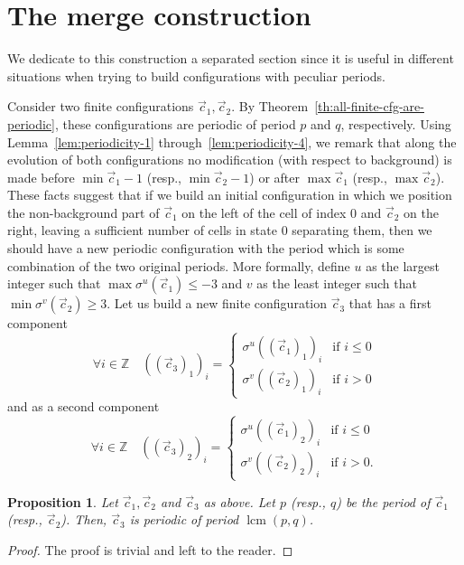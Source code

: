 \documentclass[submission,copyright,creativecommons]{eptcs}
\DeclareMathOperator{\lcm}{lcm}
\newcommand{\Z}{\ensuremath{\mathbb{Z}}\xspace}
\newtheorem{proposition}{Proposition}
\begin{document}
%
\section{The merge construction}
\label{sec:merge-construction}
%
We dedicate to this construction a separated section since it is useful in different situations
when trying to build configurations with peculiar periods.

Consider two finite configurations $\vec c_1, \vec c_2$. By Theorem~\ref{th:all-finite-cfg-are-periodic}, these configurations
are periodic of
period $p$ and $q$, respectively.
Using Lemma~\ref{lem:periodicity-1} through~\ref{lem:periodicity-4},
we remark that along the evolution of
both configurations no modification (with respect to background) is made before $\min\vec c_1-1$ (resp., $\min\vec c_2-1$) or after $\max\vec c_1$ (resp.,
$\max\vec c_2$).
These facts suggest that if we build an initial configuration in which we position the non-background part of $\vec c_1$ on the left of the cell of index $0$ and $\vec c_2$ on the right, leaving a sufficient number of cells in state $0$ separating them, then we should have a new periodic configuration with the period which is some combination of the two original periods. More formally, define $u$ as the largest
integer such that $\max \sigma^u\left(\vec c_1\right)\leq-3$ and $v$ as the least integer such that $\min\sigma^v\left(\vec c_2\right)\geq3$.
Let us build a new finite configuration $\vec c_3$ that has a first component
\[
\forall i\in\Z\quad((\vec c_3)_1)_i=
\begin{cases}
\sigma^u((\vec c_1)_1)_i&\text{if }i\leq0\\
\sigma^v((\vec c_2)_1)_i&\text{if }i>0
\end{cases}
\]
and as a second component
\[
\forall i\in\Z\quad ((\vec c_3)_2)_i=
\begin{cases}
\sigma^u((\vec c_1)_2)_i&\text{if }i\leq0\\
\sigma^v((\vec c_2)_2)_i&\text{if }i>0.
\end{cases}
\]

\begin{proposition}
Let $\vec c_1, \vec c_2$ and $\vec c_3$ as above. Let $p$ (resp., $q$) be the period of $\vec c_1$ (resp., $\vec c_2$). Then, $\vec c_3$ is periodic of period $\lcm(p,q)$.
\end{proposition}
\begin{proof}
The proof is trivial and left to the reader.
\end{proof}
\end{document}
